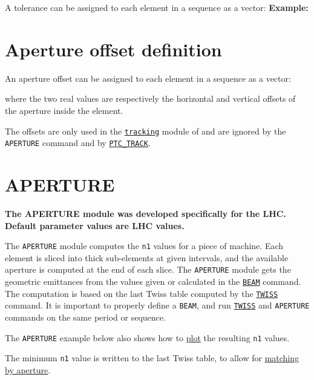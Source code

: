 A tolerance can be assigned to each element in a \madx sequence as a vector: 
\textbf{Example:}

\section{Aperture offset definition}
\label{sec:aperoffset}

An aperture offset can be assigned to each element in a \madx sequence as a vector: 

where the two real values are respectively the horizontal and vertical
offsets of the aperture inside the element. 

The offsets are only used in the
\hyperref[chap:thintrack]{\texttt{tracking}}  
module of \madx and are ignored by the \texttt{APERTURE} command and by 
\hyperref[sec:ptc-track]{\texttt{PTC\_TRACK}}.


\section{APERTURE}
\label{sec:aperture}
\textbf{The APERTURE module was developed specifically for the LHC.\\ 
Default parameter values are LHC values.} 

The \texttt{APERTURE} module computes the \texttt{n1} values for a piece of machine. 
Each element is sliced into thick sub-elements at given intervals, and
the available aperture is computed at the end of each slice. 
The \texttt{APERTURE} module gets the geometric emittances from the values given 
or calculated in the \hyperref[chap:beam]{\texttt{BEAM}} command. 
The computation is based on the last Twiss table computed by the 
\hyperref[chap:twiss]{\texttt{TWISS}} command. 
It is important to properly define a \texttt{BEAM}, and run 
\hyperref[chap:twiss]{\texttt{TWISS}} and \texttt{APERTURE} commands 
on the same period or sequence.

The \texttt{APERTURE} example below also shows how to \hyperref[chap:plot]{plot} 
the resulting \texttt{n1} values.

The minimum \texttt{n1} value is written to the last Twiss table, to
allow for \hyperref[chap:match]{matching by aperture}.


